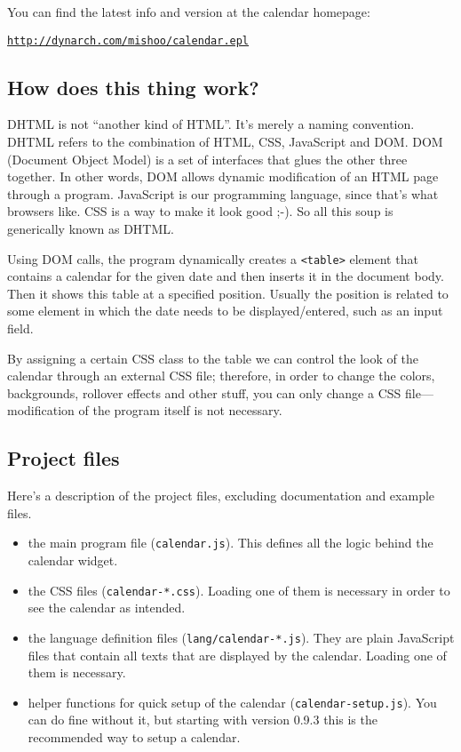 \documentclass[a4paper,10pt]{article}
\begin{document}
You can find the latest info and version at the calendar homepage:

\begin{center}
{\href{http://dynarch.com/mishoo/calendar.epl}
{\texttt{http://dynarch.com/mishoo/calendar.epl}}}
\end{center}

\subsection{How does this thing work?}

DHTML is not ``another kind of HTML''.  It's merely a naming convention.  DHTML
refers to the combination of HTML, CSS, JavaScript and DOM.  DOM (Document
Object Model) is a set of interfaces that glues the other three together.  In
other words, DOM allows dynamic modification of an HTML page through a program.
JavaScript is our programming language, since that's what browsers like.  CSS
is a way to make it look good ;-).  So all this soup is generically known as
DHTML.

Using DOM calls, the program dynamically creates a \texttt{<table>} element
that contains a calendar for the given date and then inserts it in the document
body.  Then it shows this table at a specified position.  Usually the position
is related to some element in which the date needs to be displayed/entered,
such as an input field.

By assigning a certain CSS class to the table we can control the look of the
calendar through an external CSS file; therefore, in order to change the
colors, backgrounds, rollover effects and other stuff, you can only change a
CSS file---modification of the program itself is not necessary.

\subsection{Project files}

Here's a description of the project files, excluding documentation and example
files.

\begin{itemize}

\item the main program file (\texttt{calendar.js}).  This defines all the logic
behind the calendar widget.

\item the CSS files (\texttt{calendar-*.css}).  Loading one of them is
necessary in order to see the calendar as intended.

\item the language definition files (\texttt{lang/calendar-*.js}).  They are
plain JavaScript files that contain all texts that are displayed by the
calendar.  Loading one of them is necessary.

\item helper functions for quick setup of the calendar
(\texttt{calendar-setup.js}).  You can do fine without it, but starting with
version 0.9.3 this is the recommended way to setup a calendar.

\end{itemize}
\end{document}
